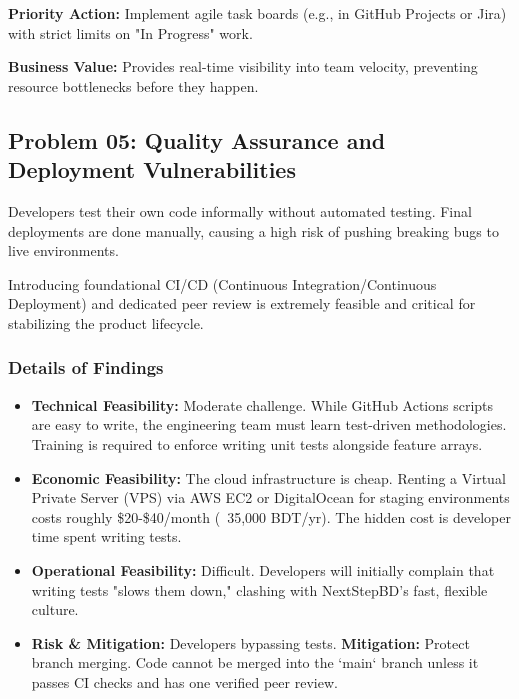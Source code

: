 \documentclass[12pt,a4paper]{report}
\begin{document}
\begin{recommendBox}
\textbf{Priority Action:} Implement agile task boards (e.g., in GitHub Projects or Jira) with strict limits on "In Progress" work.

\textbf{Business Value:} Provides real-time visibility into team velocity, preventing resource bottlenecks before they happen.
\end{recommendBox}

\subsection{Problem 05: Quality Assurance and Deployment Vulnerabilities}

\begin{problemBox}
Developers test their own code informally without automated testing. Final deployments are done manually, causing a high risk of pushing breaking bugs to live environments.
\end{problemBox}

\begin{summaryBox}
Introducing foundational CI/CD (Continuous Integration/Continuous Deployment) and dedicated peer review is extremely feasible and critical for stabilizing the product lifecycle.
\end{summaryBox}

\subsubsection{Details of Findings}

\begin{itemize}[leftmargin=*]
    \item \textbf{Technical Feasibility:} Moderate challenge. While GitHub Actions scripts are easy to write, the engineering team must learn test-driven methodologies. Training is required to enforce writing unit tests alongside feature arrays.
    \item \textbf{Economic Feasibility:} The cloud infrastructure is cheap. Renting a Virtual Private Server (VPS) via AWS EC2 or DigitalOcean for staging environments costs roughly \$20-\$40/month (~35,000 BDT/yr). The hidden cost is developer time spent writing tests.
    \item \textbf{Operational Feasibility:} Difficult. Developers will initially complain that writing tests "slows them down," clashing with NextStepBD's fast, flexible culture. 
    \item \textbf{Risk \& Mitigation:} Developers bypassing tests. \textbf{Mitigation:} Protect branch merging. Code cannot be merged into the `main` branch unless it passes CI checks and has one verified peer review.
\end{itemize}
\end{document}
